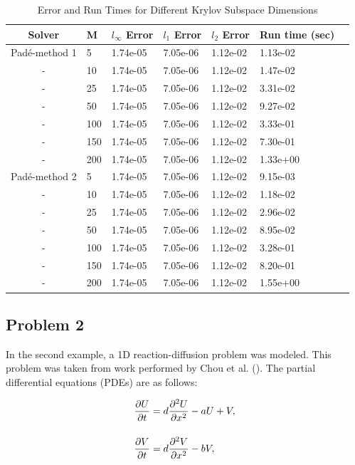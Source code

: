 \begin{table}[ht!]
   \caption{\label{tab:diffusion_problem1_results_krylov} Error and Run Times for Different Krylov Subspace Dimensions}
   \centering
   \begin{tabular}{cllllll}
   \hline
   Solver & M & $l_{\infty}$ Error & $l_{1}$ Error & $l_{2}$ Error & Run time (sec)\\
   \hline
   Pad\'e-method 1 &   5 & 1.74e-05 & 7.05e-06 & 1.12e-02 & 1.13e-02 \\
   - &  10 & 1.74e-05 & 7.05e-06 & 1.12e-02 & 1.47e-02 \\
   - &  25 & 1.74e-05 & 7.05e-06 & 1.12e-02 & 3.31e-02 \\
   - &  50 & 1.74e-05 & 7.05e-06 & 1.12e-02 & 9.27e-02 \\
   - & 100 & 1.74e-05 & 7.05e-06 & 1.12e-02 & 3.33e-01 \\
   - & 150 & 1.74e-05 & 7.05e-06 & 1.12e-02 & 7.30e-01 \\
   - & 200 & 1.74e-05 & 7.05e-06 & 1.12e-02 & 1.33e+00 \\
   Pad\'e-method 2 &   5 & 1.74e-05 & 7.05e-06 & 1.12e-02 & 9.15e-03 \\
   - &  10 & 1.74e-05 & 7.05e-06 & 1.12e-02 & 1.18e-02 \\
   - &  25 & 1.74e-05 & 7.05e-06 & 1.12e-02 & 2.96e-02 \\
   - &  50 & 1.74e-05 & 7.05e-06 & 1.12e-02 & 8.95e-02 \\
   - & 100 & 1.74e-05 & 7.05e-06 & 1.12e-02 & 3.28e-01 \\
   - & 150 & 1.74e-05 & 7.05e-06 & 1.12e-02 & 8.20e-01 \\
   - & 200 & 1.74e-05 & 7.05e-06 & 1.12e-02 & 1.55e+00 \\
   \hline
   \end{tabular}
\end{table}


\FloatBarrier
\clearpage

\subsection{Problem 2}
In the second example, a 1D reaction-diffusion problem was modeled. This problem was taken from work performed by Chou et al. (\cite{ching2007}). The partial differential equations (PDEs) are as follows:

\begin{equation}
\setlength{\jot}{15pt}
\begin{split}
    \frac{\partial U}{\partial t} &= d\frac{\partial^{2}U}{\partial x^{2}} - aU + V, \\
    \frac{\partial V}{\partial t} &=
    d\frac{\partial^{2}V}{\partial x^{2}} - bV,
\end{split}
    \label{eq:problem2Eqs}
\end{equation}

